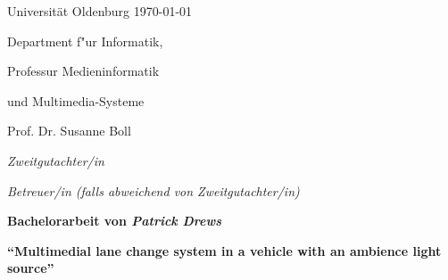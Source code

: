 \documentclass[a4paper, 11pt]{article}
\newcommand{\KandidatIn}{\emph{Patrick Drews}}
\newcommand{\Titel}{Multimedial lane change system in a vehicle with an ambience light source} %
\newcommand{\GutachterIn}{Prof. Dr. Susanne Boll}%
\newcommand{\ZweitgutachterIn}{\emph{Zweitgutachter/in}} %
\newcommand{\BetreuerIn}{\emph{Betreuer/in (falls abweichend von Zweitgutachter/in)}} %
\newcommand{\Arbeitstyp}{Bachelorarbeit}
\begin{document}



Universit\"{a}t Oldenburg \hfill \today

Department f"{u}r Informatik,

Professur Medieninformatik 

und Multimedia-Systeme

\GutachterIn{}

\ZweitgutachterIn{}

\BetreuerIn{}\newline

\begin{center}

  \large{\bf \Arbeitstyp{} von \KandidatIn{}}

  \vspace*{0.5cm}

 \large{\bf "`\Titel"'}

\end{center}

\setlength{\parskip}{1.5ex plus0.5ex minus 0.5ex}

\end{document}

